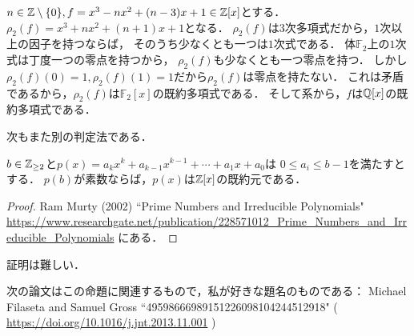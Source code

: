 \documentclass[lualatex, ja=standard, a4paper]{bxjsarticle}
\begin{document}
\begin{Example}
    $n \in \mathbb{Z} \setminus \{0\}, f=x^3-nx^2+(n-3)x+1 \in \mathbb{Z}[x]$とする．
    $\rho_2(f)=x^3+nx^2+(n+1)x+1$となる．
    $\rho_2(f)$は$3$次多項式だから，$1$次以上の因子を持つならば，
    そのうち少なくとも一つは$1$次式である．
    体$\mathbb{F}_2$上の$1$次式は丁度一つの零点を持つから，
    $\rho_2(f)$も少なくとも一つ零点を持つ．
    しかし$\rho_2(f)(0)=1, \rho_2(f)(1)=1$だから$\rho_2(f)$は零点を持たない．
    これは矛盾であるから，$\rho_2(f)$は$\mathbb{F}_2[x]$の既約多項式である．
    そして系から，$f$は$\mathbb{Q}[x]$の既約多項式である．
\end{Example}

次もまた別の判定法である．
\begin{Thm}
    $b \in \mathbb{Z}_{\geq 2}$と$p(x)=a_{k}x^{k}+a_{k-1}x^{k-1}+\cdots +a_{1}x+a_{0}$は
    $0 \leq a_{i}\leq b-1$を満たすとする．
    $p(b)$が素数ならば，$p(x)$は$\mathbb{Z}[x]$の既約元である．
\end{Thm}
\begin{proof}
    Ram Murty (2002) ``Prime Numbers and Irreducible Polynomials"
    \url{https://www.researchgate.net/publication/228571012_Prime_Numbers_and_Irreducible_Polynomials} にある．
\end{proof}

証明は難しい．

次の論文はこの命題に関連するもので，私が好きな題名のものである：
Michael Filaseta and Samuel Gross ``49598666989151226098104244512918"
( \url{https://doi.org/10.1016/j.jnt.2013.11.001} )
\end{document}
